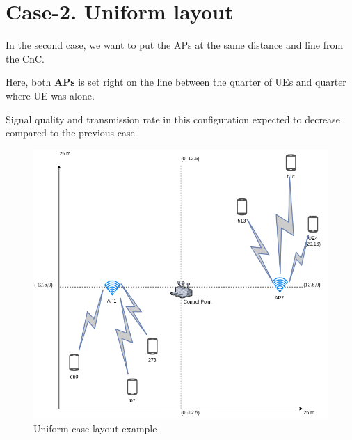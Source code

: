 \hypertarget{case-2.-uniform-layout}{%
\section{Case-2. Uniform layout}\label{case-2.-uniform-layout}}

In the second case, we want to put the APs at the same distance and line
from the CnC.

Here, both \textbf{APs} is set right on the line between the quarter of
UEs and quarter where UE was alone.

Signal quality and transmission rate in this configuration expected to
decrease compared to the previous case.

\begin{figure}[H]
	\centering
	\includegraphics[width=\linewidth,keepaspectratio]{images/05-cases-description-Exp4-Uniform.png}
\caption{Uniform case layout example}
\end{figure}
